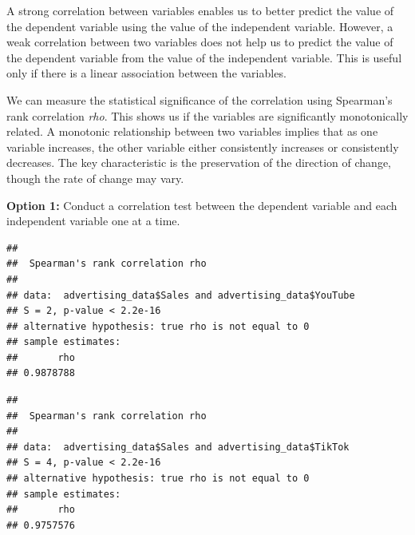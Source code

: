 \documentclass[
]{article}
\newenvironment{Shaded}{\begin{snugshade}}{\end{snugshade}}
\newcommand{\AttributeTok}[1]{\textcolor[rgb]{0.13,0.29,0.53}{#1}}
\newcommand{\FunctionTok}[1]{\textcolor[rgb]{0.13,0.29,0.53}{\textbf{#1}}}
\newcommand{\NormalTok}[1]{#1}
\newcommand{\SpecialCharTok}[1]{\textcolor[rgb]{0.81,0.36,0.00}{\textbf{#1}}}
\newcommand{\StringTok}[1]{\textcolor[rgb]{0.31,0.60,0.02}{#1}}
\begin{document}
A strong correlation between variables enables us to better predict the
value of the dependent variable using the value of the independent
variable. However, a weak correlation between two variables does not
help us to predict the value of the dependent variable from the value of
the independent variable. This is useful only if there is a linear
association between the variables.

We can measure the statistical significance of the correlation using
Spearman's rank correlation \emph{rho}. This shows us if the variables
are significantly monotonically related. A monotonic relationship
between two variables implies that as one variable increases, the other
variable either consistently increases or consistently decreases. The
key characteristic is the preservation of the direction of change,
though the rate of change may vary.

\textbf{Option 1:} Conduct a correlation test between the dependent
variable and each independent variable one at a time.

\begin{Shaded}
\end{Shaded}

\begin{verbatim}
## 
##  Spearman's rank correlation rho
## 
## data:  advertising_data$Sales and advertising_data$YouTube
## S = 2, p-value < 2.2e-16
## alternative hypothesis: true rho is not equal to 0
## sample estimates:
##       rho 
## 0.9878788
\end{verbatim}

\begin{Shaded}
\end{Shaded}

\begin{verbatim}
## 
##  Spearman's rank correlation rho
## 
## data:  advertising_data$Sales and advertising_data$TikTok
## S = 4, p-value < 2.2e-16
## alternative hypothesis: true rho is not equal to 0
## sample estimates:
##       rho 
## 0.9757576
\end{verbatim}
\end{document}
